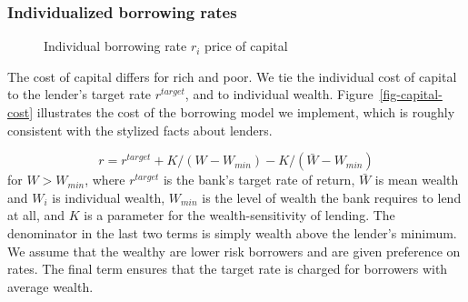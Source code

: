 {\subsubsection{Individualized borrowing rates} \label{sec:borowing-rate}

    \begin{figure}
    \centering
    \label{fig-capital-cost}
    \caption{Individual borrowing rate $r_i$ price of capital}
    \label{fig:Wealth-based}
    \end{figure}

The cost of capital differs for rich and poor. We tie the individual cost of capital %
to the lender's target rate $r^{target}$, and to individual wealth. Figure~\ref{fig-capital-cost} illustrates the cost of the borrowing model we implement, which is  roughly consistent  with the stylized facts about lenders. 
 
\begin{equation}
{r} = r^{target}+ K/(W-W_{min}) -K/(\bar W - W_{min})\label{eqn-interest-wealth-relationship}
\end{equation}
for $W>W_{min}$, where  $r^{target}$ is the bank's target rate of return,  $\bar{W}$ is mean wealth and $W_i$ is individual wealth, $W_{min}$ is the level of wealth the bank requires to lend at all, and $K$ is a parameter for the wealth-sensitivity of lending. The denominator in the last two terms is simply wealth above the lender's minimum. We assume that the wealthy are lower risk borrowers and are given preference on rates. The final term ensures that the target rate is charged for borrowers with average wealth.





}
